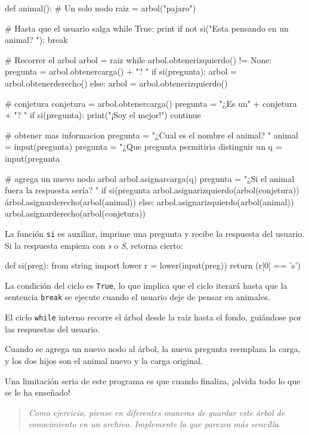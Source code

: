 \beforeverb 
\begin{pythoncode}
def animal():
  # Un solo nodo
  raiz = arbol("pajaro")

  # Hasta que el usuario salga
  while True:
    print
    if not si("Esta pensando en un animal? "): 
       break

    # Recorrer el arbol
    arbol = raiz
    while arbol.obtenerizquierdo() != None:
      pregunta = arbol.obtenercarga() + "? "
      if si(pregunta):
        arbol = arbol.obtenerderecho()
      else:
        arbol = arbol.obtenerizquierdo()

    # conjetura
    conjetura = arbol.obtenercarga()
    pregunta = "¿Es un" + conjetura + "? "
    if si(pregunta):
      print("¡Soy el mejor!")
      continue

    # obtener mas informacion
    pregunta  = "¿Cual es el nombre el animal? "
    animal  = input(pregunta)
    pregunta  = "¿Que pregunta permitiria 
                  distinguir un %
    q = input(pregunta %

    # agrega un nuevo nodo arbol
    arbol.asignarcarga(q)
    pregunta = "¿Si el animal fuera %
                la respuesta sería? "
    if si(pregunta %
      arbol.asignarizquierdo(arbol(conjetura))
      árbol.asignarderecho(arbol(animal))
    else:
      arbol.asignarizquierdo(arbol(animal))
      arbol.asignarderecho(arbol(conjetura))
\end{pythoncode}
\afterverb La función \texttt{si} es auxiliar, imprime una pregunta
y recibe la respuesta del usuario. Si la respuesta empieza con {\em
s} o {\em S}, retorna cierto:

\beforeverb 
\begin{pythoncode}
def si(preg):
  from string import lower
  r = lower(input(preg))
  return (r[0] == 's')
\end{pythoncode}
\afterverb La condición del ciclo es \texttt{True}, lo que implica
que el ciclo iterará hasta que la sentencia \texttt{break} se ejecute
cuando el usuario deje de pensar en animales.

El ciclo \texttt{while} interno recorre el árbol desde la raíz hasta
el fondo, guiándose por las respuestas del usuario.

Cuando se agrega un nuevo nodo al árbol, la nueva pregunta reemplaza
la carga, y los dos hijos son el animal nuevo y la carga original.

Una limitación seria de este programa es que cuando finaliza, ¡olvida
todo lo que se le ha enseñado!
\begin{quote}
{\em Como ejercicio, piense en diferentes maneras de guardar este
árbol de conocimiento en un archivo. Implemente la que parezca más
sencilla.} 
\end{quote}

